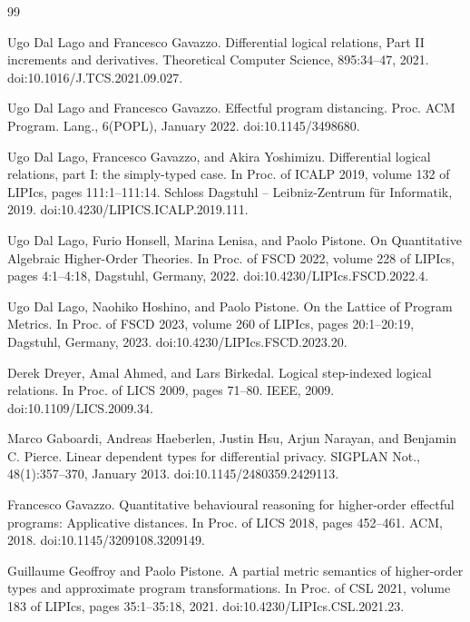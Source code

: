 \documentclass[10pt,a4paper]{amsart}
\begin{document}
\begin{thebibliography}{99}
\par\noindent  [9]  Ugo Dal Lago and Francesco Gavazzo.  Differential logical relations, Part II increments and derivatives.  Theoretical Computer Science, 895:34–47, 2021.  doi:10.1016/J.TCS.2021.09.027.  
 
\par\noindent  [10]  Ugo Dal Lago and Francesco Gavazzo.  Effectful program distancing.  Proc. ACM Program. Lang., 6(POPL), January 2022.  doi:10.1145/3498680.  
 
\par\noindent  [11]  Ugo Dal Lago, Francesco Gavazzo, and Akira Yoshimizu.  Differential logical relations, part I: the simply-typed case.  In Proc. of ICALP 2019, volume 132 of LIPIcs, pages 111:1–111:14. Schloss Dagstuhl – Leibniz-Zentrum für Informatik, 2019.  doi:10.4230/LIPICS.ICALP.2019.111.  
 
\par\noindent  [12]  Ugo Dal Lago, Furio Honsell, Marina Lenisa, and Paolo Pistone.  On Quantitative Algebraic Higher-Order Theories.  In Proc. of FSCD 2022, volume 228 of LIPIcs, pages 4:1–4:18, Dagstuhl, Germany, 2022.  doi:10.4230/LIPIcs.FSCD.2022.4.  
 
\par\noindent  [13]  Ugo Dal Lago, Naohiko Hoshino, and Paolo Pistone.  On the Lattice of Program Metrics.  In Proc. of FSCD 2023, volume 260 of LIPIcs, pages 20:1–20:19, Dagstuhl, Germany, 2023.  doi:10.4230/LIPIcs.FSCD.2023.20.  
 
\par\noindent  [14]  Derek Dreyer, Amal Ahmed, and Lars Birkedal.  Logical step-indexed logical relations.  In Proc. of LICS 2009, pages 71–80. IEEE, 2009.  doi:10.1109/LICS.2009.34.  
 
\par\noindent  [15]  Marco Gaboardi, Andreas Haeberlen, Justin Hsu, Arjun Narayan, and Benjamin C. Pierce.  Linear dependent types for differential privacy.  SIGPLAN Not., 48(1):357–370, January 2013.  doi:10.1145/2480359.2429113.  
 
\par\noindent  [16]  Francesco Gavazzo.  Quantitative behavioural reasoning for higher-order effectful programs: Applicative distances.  In Proc. of LICS 2018, pages 452–461. ACM, 2018.  doi:10.1145/3209108.3209149.  
 
\par\noindent  [17]  Guillaume Geoffroy and Paolo Pistone.  A partial metric semantics of higher-order types and approximate program transformations.  In Proc. of CSL 2021, volume 183 of LIPIcs, pages 35:1–35:18, 2021.  doi:10.4230/LIPIcs.CSL.2021.23.  
 

\end{thebibliography}
\end{document}
